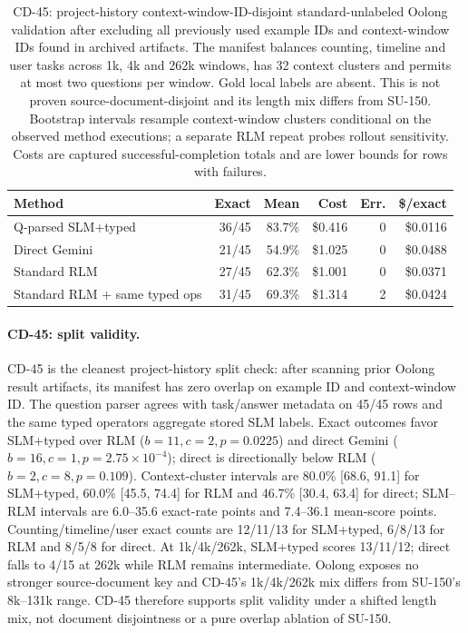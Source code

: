 \begin{table}[!t]
\centering
\small
\setlength{\tabcolsep}{3pt}
\begin{tabular}{@{}lrrrrr@{}}
\toprule
\textbf{Method} & \textbf{Exact} & \textbf{Mean} & \textbf{Cost} & \textbf{Err.} & \textbf{\$/exact} \\
\midrule
Q-parsed SLM+typed & 36/45 & 83.7\% & \$0.416 & 0 & \$0.0116 \\
Direct Gemini & 21/45 & 54.9\% & \$1.025 & 0 & \$0.0488 \\
Standard RLM & 27/45 & 62.3\% & \$1.001 & 0 & \$0.0371 \\
Standard RLM + same typed ops & 31/45 & 69.3\% & \$1.314 & 2 & \$0.0424 \\
\bottomrule
\end{tabular}
\caption{CD-45: project-history context-window-ID-disjoint standard-unlabeled Oolong validation after excluding all previously used example IDs and context-window IDs found in archived artifacts. The manifest balances counting, timeline and user tasks across 1k, 4k and 262k windows, has 32 context clusters and permits at most two questions per window. Gold local labels are absent. This is not proven source-document-disjoint and its length mix differs from SU-150. Bootstrap intervals resample context-window clusters conditional on the observed method executions; a separate RLM repeat probes rollout sensitivity. Costs are captured successful-completion totals and are lower bounds for rows with failures.}
\label{tab:supp-oolong-context-disjoint-n45}
\end{table}

\paragraph{CD-45: split validity.}
CD-45 is the cleanest project-history split check: after scanning prior Oolong result artifacts, its manifest has zero overlap on example ID and context-window ID. The question parser agrees with task/answer metadata on 45/45 rows and the same typed operators aggregate stored SLM labels. Exact outcomes favor SLM+typed over RLM ($b=11,c=2,p=0.0225$) and direct Gemini ($b=16,c=1,p=2.75\times10^{-4}$); direct is directionally below RLM ($b=2,c=8,p=0.109$). Context-cluster intervals are 80.0\% [68.6, 91.1] for SLM+typed, 60.0\% [45.5, 74.4] for RLM and 46.7\% [30.4, 63.4] for direct; SLM--RLM intervals are 6.0--35.6 exact-rate points and 7.4--36.1 mean-score points. Counting/timeline/user exact counts are 12/11/13 for SLM+typed, 6/8/13 for RLM and 8/5/8 for direct. At 1k/4k/262k, SLM+typed scores 13/11/12; direct falls to 4/15 at 262k while RLM remains intermediate. Oolong exposes no stronger source-document key and CD-45's 1k/4k/262k mix differs from SU-150's 8k--131k range. CD-45 therefore supports split validity under a shifted length mix, not document disjointness or a pure overlap ablation of SU-150.

